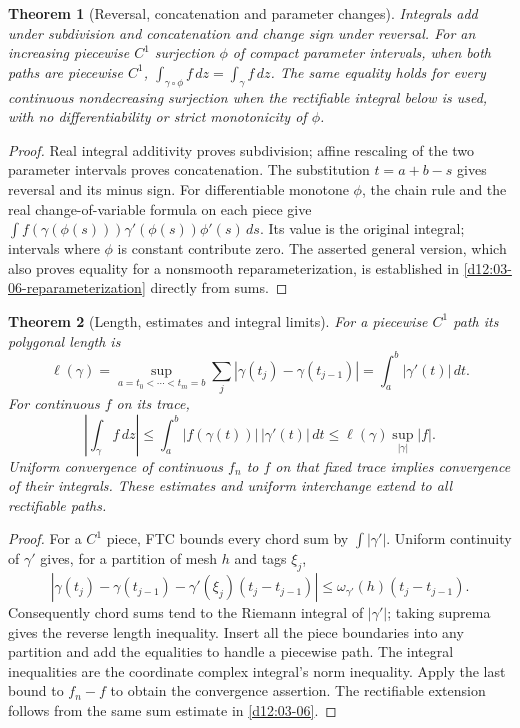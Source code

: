 \documentclass[11pt,a4paper,openany]{book}
\newtheorem{theorem}{Theorem}[chapter]
\theoremstyle{definition}
\theoremstyle{remark}\newtheorem{remark}[theorem]{Remark}
\newcommand{\dd}{\,d}\newcommand{\iu}{\mathrm i}
\newcommand{\family}[1]{}
\begin{document}
\begin{theorem}[Reversal, concatenation and parameter changes]\family{D12.03.02}\label{d12:03-02}
Integrals add under subdivision and concatenation and change sign under
reversal. For an increasing piecewise \(C^1\) surjection \(\phi\) of
compact parameter intervals, when both paths are piecewise \(C^1\),
\(\int_{\gamma\circ\phi}f\dd z=\int_\gamma f\dd z\).
The same equality holds for every continuous nondecreasing surjection
when the rectifiable integral below is used, with no differentiability
or strict monotonicity of \(\phi\).
\end{theorem}
\begin{proof}
Real integral additivity proves subdivision; affine rescaling of the two
parameter intervals proves concatenation. The substitution
\(t=a+b-s\) gives reversal and its minus sign.
For differentiable monotone \(\phi\), the chain rule and the real
change-of-variable formula on each piece give
\(\int f(\gamma(\phi(s)))\gamma'(\phi(s))\phi'(s)\dd s\).
Its value is the original integral; intervals where \(\phi\) is constant
contribute zero. The asserted general version, which also proves equality
for a nonsmooth reparameterization, is established in
\cref{d12:03-06-reparameterization} directly from sums.
\end{proof}

\begin{theorem}[Length, estimates and integral limits]\family{D12.03.03}\label{d12:03-03}
For a piecewise \(C^1\) path its polygonal length is
\[
 \ell(\gamma)=\sup_{a=t_0<\cdots<t_m=b}
       \sum_j|\gamma(t_j)-\gamma(t_{j-1})|
       =\int_a^b|\gamma'(t)|\dd t.
\]
For continuous \(f\) on its trace,
\[
 \left|\int_\gamma f\dd z\right|
 \le\int_a^b|f(\gamma(t))|\,|\gamma'(t)|\dd t
 \le\ell(\gamma)\sup_{|\gamma|}|f|.
\]
Uniform convergence of continuous \(f_n\) to \(f\) on that fixed trace
implies convergence of their integrals. These estimates and uniform
interchange extend to all rectifiable paths.
\end{theorem}
\begin{proof}
For a \(C^1\) piece, FTC bounds every chord sum by \(\int|\gamma'|\).
Uniform continuity of \(\gamma'\) gives, for a partition of mesh \(h\)
and tags \(\xi_j\),
\[
 \left|\gamma(t_j)-\gamma(t_{j-1})
       -\gamma'(\xi_j)(t_j-t_{j-1})\right|
 \le\omega_{\gamma'}(h)(t_j-t_{j-1}).
\]
Consequently chord sums tend to the Riemann integral of \(|\gamma'|\);
taking suprema gives the reverse length inequality. Insert all the
piece boundaries into any partition and add the equalities to handle
a piecewise path. The integral inequalities are the coordinate complex
integral's norm inequality. Apply the last bound to \(f_n-f\) to obtain
the convergence assertion. The rectifiable extension follows from the
same sum estimate in \cref{d12:03-06}.
\end{proof}
\end{document}
